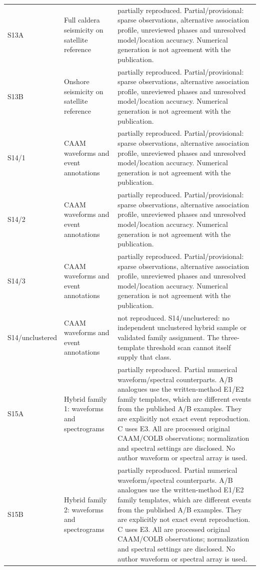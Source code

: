 \begin{longtable}{>{\raggedright\arraybackslash}p{.13\linewidth}>{\raggedright\arraybackslash}p{.28\linewidth}>{\raggedright\arraybackslash}p{.49\linewidth}}
S13A & Full caldera seismicity on satellite reference & partially reproduced. Partial/provisional: sparse observations, alternative association profile, unreviewed phases and unresolved model/location accuracy. Numerical generation is not agreement with the publication.\\[3pt]
S13B & Onshore seismicity on satellite reference & partially reproduced. Partial/provisional: sparse observations, alternative association profile, unreviewed phases and unresolved model/location accuracy. Numerical generation is not agreement with the publication.\\[3pt]
S14/\allowbreak{}1 & CAAM waveforms and event annotations & partially reproduced. Partial/provisional: sparse observations, alternative association profile, unreviewed phases and unresolved model/location accuracy. Numerical generation is not agreement with the publication.\\[3pt]
S14/\allowbreak{}2 & CAAM waveforms and event annotations & partially reproduced. Partial/provisional: sparse observations, alternative association profile, unreviewed phases and unresolved model/location accuracy. Numerical generation is not agreement with the publication.\\[3pt]
S14/\allowbreak{}3 & CAAM waveforms and event annotations & partially reproduced. Partial/provisional: sparse observations, alternative association profile, unreviewed phases and unresolved model/location accuracy. Numerical generation is not agreement with the publication.\\[3pt]
S14/\allowbreak{}unclustered & CAAM waveforms and event annotations & not reproduced. S14/unclustered: no independent unclustered hybrid sample or validated family assignment. The three-template threshold scan cannot itself supply that class.\\[3pt]
S15A & Hybrid family 1: waveforms and spectrograms & partially reproduced. Partial numerical waveform/spectral counterparts. A/B analogues use the written-method E1/E2 family templates, which are different events from the published A/B examples. They are explicitly not exact event reproduction. C uses E3. All are processed original CAAM/COLB observations; normalization and spectral settings are disclosed. No author waveform or spectral array is used.\\[3pt]
S15B & Hybrid family 2: waveforms and spectrograms & partially reproduced. Partial numerical waveform/spectral counterparts. A/B analogues use the written-method E1/E2 family templates, which are different events from the published A/B examples. They are explicitly not exact event reproduction. C uses E3. All are processed original CAAM/COLB observations; normalization and spectral settings are disclosed. No author waveform or spectral array is used.\\[3pt]

\end{longtable}
